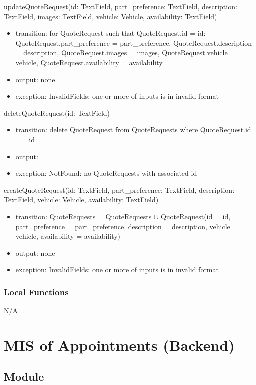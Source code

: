 \documentclass[12pt, titlepage]{article}
\begin{document}
\noindent updateQuoteRequest(id: TextField, part\_preference: TextField, description: TextField, images: TextField, vehicle: Vehicle, availability: TextField)
\begin{itemize}
    \item transition: for QuoteRequest such that QuoteRequest.id = id: QuoteRequest.part\_preference = part\_preference, QuoteRequest.description = description, QuoteRequest.images = images, QuoteRequest.vehicle = vehicle, QuoteRequest.availability = availability
    \item output: none
    \item exception: InvalidFields: one or more of inputs is in invalid format
\end{itemize}

\noindent deleteQuoteRequest(id: TextField)
\begin{itemize}
    \item transition: delete QuoteRequest from QuoteRequests where QuoteRequest.id == id
    \item output:
    \item exception: NotFound: no QuoteRequests with associated id 
\end{itemize}

\noindent createQuoteRequest(id: TextField, part\_preference: TextField, description: TextField, vehicle: Vehicle, availability: TextField)
\begin{itemize}
    \item transition: QuoteRequests = QuoteRequests $\cup$ QuoteRequest(id = id, part\_preference = part\_preference, description = description, vehicle = vehicle, availability = availability)
    \item output: none
    \item exception: InvalidFields: one or more of inputs is in invalid format
\end{itemize}

\subsubsection{Local Functions}

N/A

\newpage

\section{MIS of Appointments (Backend)}

\subsection{Module}
\end{document}
